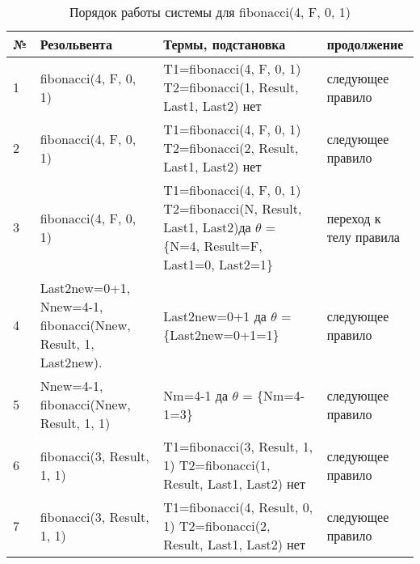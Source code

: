 \begin{table}[h]
	\begin{center}
		\begin{threeparttable}
			\captionsetup{justification=raggedright,singlelinecheck=off}
			\caption{Порядок работы системы для fibonacci(4, F, 0, 1)}
			\begin{tabular}{|m{0.5cm}|m{3.5cm}|m{8.5cm}|m{3cm}|}
				\hline
				№ & Резольвента &Термы, подстановка & продолжение \\
				\hline
				1 & fibonacci(4, F, 0, 1) & T1=fibonacci(4, F, 0, 1) \newline T2=fibonacci(1, Result, Last1, Last2) \newline нет & следующее правило \\
				\hline
				2 & fibonacci(4, F, 0, 1) & T1=fibonacci(4, F, 0, 1) \newline T2=fibonacci(2, Result, Last1, Last2) \newline нет & следующее правило \\
				\hline
				3 & fibonacci(4, F, 0, 1) & T1=fibonacci(4, F, 0, 1) \newline T2=fibonacci(N, Result, Last1, Last2)\newline да \newline $\theta$ = \{N=4, Result=F, Last1=0, Last2=1\} & переход к \newline телу правила \\
				\hline
				4 & Last2new=0+1, \newline Nnew=4-1, \newline fibonacci(Nnew, Result, 1, Last2new). & Last2new=0+1 \newline да \newline $\theta$ = \{Last2new=0+1=1\} & следующее правило \\
				\hline
				5 & Nnew=4-1, \newline fibonacci(Nnew, Result, 1, 1) & Nm=4-1 \newline да \newline $\theta$ = \{Nm=4-1=3\} & следующее правило \\
				\hline
				6 & fibonacci(3, Result, 1, 1) & T1=fibonacci(3, Result, 1, 1) \newline T2=fibonacci(1, Result, Last1, Last2) \newline нет & следующее правило \\
				\hline
				7 & fibonacci(3, Result, 1, 1) & T1=fibonacci(4, Result, 0, 1) \newline T2=fibonacci(2, Result, Last1, Last2) \newline нет & следующее правило \\

\end{tabular}
\end{threeparttable}
\end{center}
\end{table}
